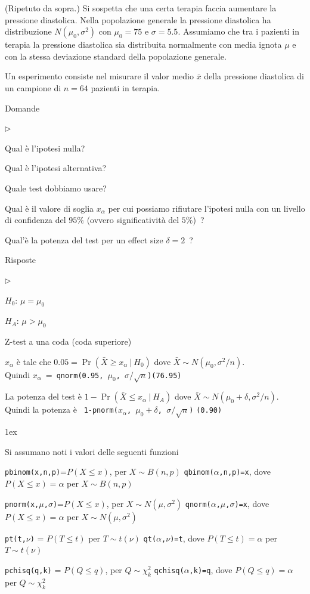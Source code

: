 \documentclass[12pt,openany]{book}
\newcommand{\mylabel}[1]{{\footnotesize\textsf{#1}}\hfill}
\renewenvironment{itemize}
  {\begin{list}{$\triangleright$}{%
   \setlength{\parskip}{0mm}
   \setlength{\topsep}{.2\baselineskip}
   \setlength{\rightmargin}{0mm}
   \setlength{\listparindent}{0mm}
   \setlength{\itemindent}{0mm}
   \setlength{\labelwidth}{3ex}
   \setlength{\itemsep}{.4\baselineskip}
   \setlength{\parsep}{0mm}
   \setlength{\partopsep}{0mm}
   \setlength{\labelsep}{1ex}
   \setlength{\leftmargin}{\labelwidth+\labelsep}
   \let\makelabel\mylabel}}{%
   \end{list}\vspace*{-1.3mm}}
\theoremstyle{mio}
\theoremstyle{liscio}
\begin{document}
(Ripetuto da sopra.) Si sospetta che una certa terapia faccia aumentare la pressione diastolica. Nella popolazione generale la pressione diastolica ha distribuzione $N(\mu_0,\sigma^2)$ con $\mu_0=75$ e $\sigma=5.5$. Assumiamo che tra i pazienti in terapia la pressione diastolica sia distribuita normalmente con media ignota $\mu$ e con la stessa deviazione standard della popolazione generale. 

Un esperimento consiste nel misurare il valor medio $\bar x$ della pressione diastolica di un campione di $n=64$ pazienti in terapia.

Domande

\begin{itemize}
\item[1.] Qual è l'ipotesi nulla?
\item[2.] Qual è l'ipotesi alternativa?
\item[3.] Quale test dobbiamo usare?
\item[4.] Qual è il valore di soglia $x_\alpha$ per cui possiamo rifiutare l'ipotesi nulla con un livello di confidenza del $95\%$ (ovvero significatività del $5\%$)~?
\item[5.] Qual'è la potenza del test per un effect size $\delta=2$~? 
\end{itemize}

Risposte

\begin{itemize}
\item[1.] $H_0$: $\mu=\mu_0$
\item[2.] $H_A$: $\mu>\mu_0$
\item[3.] Z-test a una coda (coda superiore)
\item[4.] $x_\alpha$ è tale che $0.05=\Pr(\bar X\ge x_\alpha\ |\ H_0)$ dove $\bar X\sim N(\mu_0,\sigma^2/n)$.\\
Quindi $x_\alpha\ =\ ${\tt qnorm(0.95, $\mu_0$, $\sigma/\sqrt{n}$)\hfill(76.95)}
\item[5.] La potenza del test è $1-\Pr(\bar X\le x_\alpha\ |\ H_A)$ dove $\bar X\sim N(\mu_0+\delta,\sigma^2/n)$.\\
Quindi la potenza è \ {\tt 1-pnorm($x_\alpha$, $\mu_0+\delta$, $\sigma/\sqrt{n}$)} \hfill{\tt(0.90)}
\end{itemize}


\parskip1ex
{\hrulefill\scriptsize

Si assumano noti i valori delle seguenti funzioni

{\tt pbinom(x,n,p)}=$P(X\le x)$, per $X\sim B(n,p)$
\hfill 
{\tt qbinom($\alpha$,n,p)=x},  dove $P(X\le x)=\alpha$ per $X\sim B(n,p)$

{\tt pnorm(x,$\mu$,$\sigma$)}=$P(X\le x)$, per $X\sim N(\mu,\sigma^2)$
\hfill 
{\tt qnorm($\alpha$,$\mu$,$\sigma$)=x},  dove $P(X\le x)=\alpha$ per $X\sim N(\mu,\sigma^2)$

{\tt pt(t,$\nu$)} = $P(T\le t)$ per $T\sim t(\nu)$
\hfill
{\tt qt($\alpha$,$\nu$)=t}, dove $P(T\le t)=\alpha$ per $T\sim t(\nu)$

{\tt pchisq(q,k)} = $P(Q\le q)$, per $Q\sim \chi^2_k$
\hfill
{\tt qchisq($\alpha$,k)=q},  dove $P(Q\le q)=\alpha$ per $Q\sim \chi^2_k$
\par
}
\end{document}
